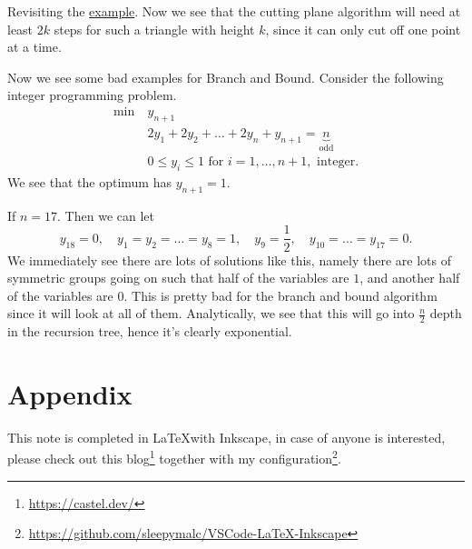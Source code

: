 Revisiting the \hyperref[eg:branch-and-bound]{example}. Now we see that the cutting plane algorithm will need at least \(2k\) steps
for such a triangle with height \(k\), since it can only cut off one point at a time.

\hr

\begin{eg}
	Now we see some bad examples for Branch and Bound. Consider the following integer programming problem.
	\begin{align*}
		\min~ & y_{n+1}                                                              \\
		      & 2y_{1} + 2y_2 + \ldots +2y_n + y_{n+1} = \underbrace{n}_{\text{odd}} \\
		      & 0\leq y_{i}\leq 1 \text{ for }i = 1, \ldots , n+1, \text{ integer}.
	\end{align*}
	We see that the optimum has \(y_{n+1} = 1\).

	If \(n = 17\). Then we can let
	\[
		y_{18} = 0,\quad y_1 = y_2 = \ldots = y_8 = 1,\quad y_9 = \frac{1}{2},\quad y_{10} = \ldots = y_{17} = 0.
	\]
	We immediately see there are lots of solutions like this, namely there are lots of symmetric groups going on such that
	half of the variables are \(1\), and another half of the variables are \(0\). This is pretty bad
	for the branch and bound algorithm since it will look at all of them. Analytically, we see that this will go into \(\frac{n}{2}\)
	depth in the recursion tree, hence it's clearly exponential.
\end{eg}

\newpage
\appendix
\section*{Appendix}
\renewcommand{\thesubsection}{\Alph{subsection}}
This note is completed in \LaTeX with Inkscape, in case of anyone is interested, please check out this blog\footnote{\url{https://castel.dev/}}
together with my configuration\footnote{\url{https://github.com/sleepymalc/VSCode-LaTeX-Inkscape}}.